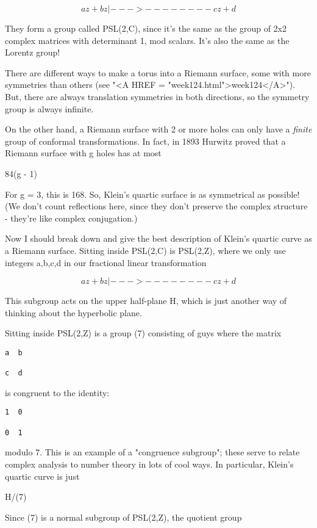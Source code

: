 $$
           az + b
z |--->   --------
           cz + d
$$
    
They form a group called PSL(2,C), since it's the same as the group of
2x2 complex matrices with determinant 1, mod scalars.  It's also the 
same as the Lorentz group!  

There are different ways to make a torus into a Riemann surface,
some with more symmetries than others (see "<A HREF = "week124.html">week124</A>").  But, there 
are always translation symmetries in both directions, so the symmetry 
group is always infinite. 

On the other hand, a Riemann surface with 2 or more holes can only 
have a \emph{finite} group of conformal transformations.  In fact, in 1893 
Hurwitz proved that a Riemann surface with g holes has at most 

84(g - 1)

For g = 3, this is 168.  So, Klein's quartic surface is as symmetrical 
as possible!  (We don't count reflections here, since they don't 
preserve the complex structure - they're like complex conjugation.)

Now I should break down and give the best description of Klein's
quartic curve as a Riemann surface.  Sitting inside PSL(2,C) is
PSL(2,Z), where we only use integers a,b,c,d in our fractional linear 
transformation

$$
           az + b
z |--->   --------
           cz + d 
$$
    
This subgroup acts on the upper half-plane H, which is just another
way of thinking about the hyperbolic plane.

Sitting inside PSL(2,Z) is a group \Gamma (7) consisting of guys where 
the matrix 

\begin{verbatim}
a  b

c  d 
\end{verbatim}
    
is congruent to the identity:

\begin{verbatim}
1  0

0  1
\end{verbatim}
    
modulo 7.  This is an example of a "congruence subgroup"; these serve
to relate complex analysis to number theory in lots of cool ways.
In particular, Klein's quartic curve is just

H/\Gamma (7)

Since \Gamma (7) is a normal subgroup of PSL(2,Z), the quotient
group 


